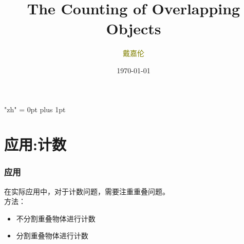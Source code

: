 \documentclass[notheorems,mathserif,table,compress]{beamer}  %
\begin{document}
\XeTeXlinebreaklocale "zh"         %
\XeTeXlinebreakskip = 0pt plus 1pt %
\begin{comment}
\AtBeginSection[]{                              %
  \frame<handout:0>{
    \frametitle{Content}\small
    \tableofcontents[current,currentsubsection]
  }
}
\AtBeginSubsection[]                            %
{
  \frame<handout:0>                             %
  {
    \frametitle{下一节内容}\small
    \tableofcontents[current,currentsubsection] %
  }
}
\end{comment}
\title[]{The Counting of Overlapping Objects}
\author[戴嘉伦]{\textcolor{olive}{戴嘉伦}}
\institute[中国海洋大学]{\small\textcolor{violet}{中国海洋大学}}
\date{\today}
\frame{ \titlepage }

\section{应用:计数}
\begin{frame}
  \frametitle{应用}
   在实际应用中，对于计数问题，需要注重重叠问题。\\
   \hspace{0.2in}方法：
   \begin{itemize}
	\item 不分割重叠物体进行计数
	\item 分割重叠物体进行计数
   \end{itemize}
\end{frame}
\end{document}

